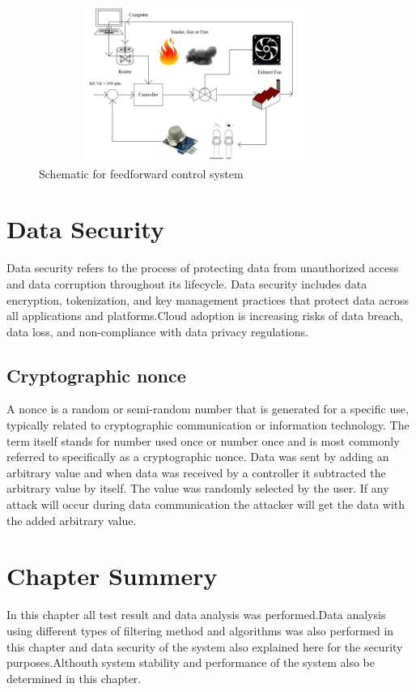 \begin{figure}[H]
	\begin{Center}
		\includegraphics[width=4in,height=2in]{34}
		\caption{Schematic for feedforward control system}
		\label{fig:_20_Schematic_for_feedforward_control_system}
	\end{Center}
\end{figure}



\par

\par
\newpage

\vspace{\baselineskip}
\section{Data Security }
Data security refers to the process of protecting data from unauthorized access and data corruption throughout its lifecycle. Data security includes data encryption, tokenization, and key management practices that protect data across all applications and platforms.Cloud adoption is increasing risks of data breach, data loss, and non-compliance with data privacy regulations.
\subsection{Cryptographic nonce}
\begin{justify}
A nonce is a random or semi-random number that is generated for a specific use, typically related to cryptographic communication or information technology. The term itself stands for number used once  or number once  and is most commonly referred to specifically as a cryptographic nonce. Data was sent by adding an arbitrary value and when data was received by a controller it subtracted the arbitrary value by itself. The value was randomly selected by the user. If any attack will occur during data communication the attacker will get the data with the added arbitrary value.
\end{justify}\par
\section{Chapter Summery}
In this chapter all test result and data analysis was performed.Data analysis using different types of filtering method and algorithms was also performed in this chapter and data security of the system also explained here for the security purposes.Althouth system stability and performance of the system also be determined in this chapter. 